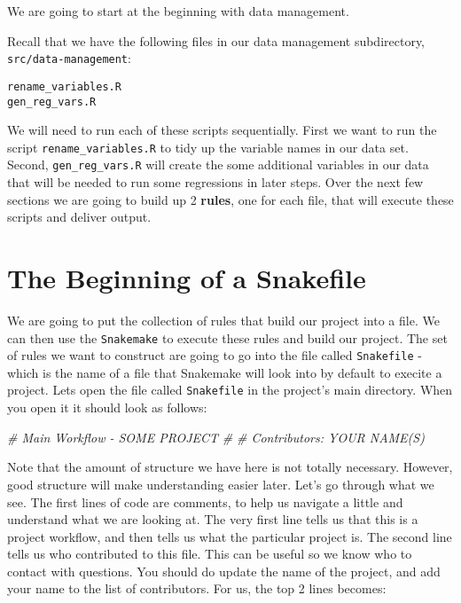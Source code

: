 \documentclass[]{book}
\newenvironment{Shaded}{\begin{snugshade}}{\end{snugshade}}
\newcommand{\CommentTok}[1]{\textcolor[rgb]{0.56,0.35,0.01}{\textit{{#1}}}}
\theoremstyle{definition}
\theoremstyle{definition}
\theoremstyle{definition}
\theoremstyle{remark}
\begin{document}
We are going to start at the beginning with data management.

Recall that we have the following files in our data management
subdirectory, \texttt{src/data-management}:

\begin{verbatim}
rename_variables.R
gen_reg_vars.R
\end{verbatim}

We will need to run each of these scripts sequentially. First we want to
run the script \texttt{rename\_variables.R} to tidy up the variable
names in our data set. Second, \texttt{gen\_reg\_vars.R} will create the
some additional variables in our data that will be needed to run some
regressions in later steps. Over the next few sections we are going to
build up 2 \textbf{rules}, one for each file, that will execute these
scripts and deliver output.

\section{The Beginning of a
Snakefile}\label{the-beginning-of-a-snakefile}

We are going to put the collection of rules that build our project into
a file. We can then use the \texttt{Snakemake} to execute these rules
and build our project. The set of rules we want to construct are going
to go into the file called \texttt{Snakefile} - which is the name of a
file that Snakemake will look into by default to execite a project. Lets
open the file called \texttt{Snakefile} in the project's main directory.
When you open it it should look as follows:

\begin{Shaded}
\begin{Highlighting}[]
\CommentTok{# Main Workflow - SOME PROJECT}
\CommentTok{#}
\CommentTok{# Contributors: YOUR NAME(S)}
\end{Highlighting}
\end{Shaded}

Note that the amount of structure we have here is not totally necessary.
However, good structure will make understanding easier later. Let's go
through what we see. The first lines of code are comments, to help us
navigate a little and understand what we are looking at. The very first
line tells us that this is a project workflow, and then tells us what
the particular project is. The second line tells us who contributed to
this file. This can be useful so we know who to contact with questions.
You should do update the name of the project, and add your name to the
list of contributors. For us, the top 2 lines becomes:
\end{document}
